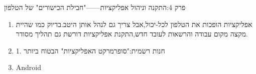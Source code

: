\begin{tcbpractice}{פרק 4:התקנה וניהול אפליקציות——"חבילת הכישורים" של הטלפון}
\begin{enumerate}
  \item אפליקציות הופכות את הטלפון לכל-יכול,אבל צריך גם לנהל אותן היטב.בדיוק כמו שהיית מקצה מקום עבודה והרשאות לעובד חדש,התקנת אפליקציות דורשת גם תהליך מסודר.
  \item 1. חנות רשמית:"סופרמרקט האפליקציות" הבטוח ביותר
  \item Android
\end{enumerate}

\end{tcbpractice}
